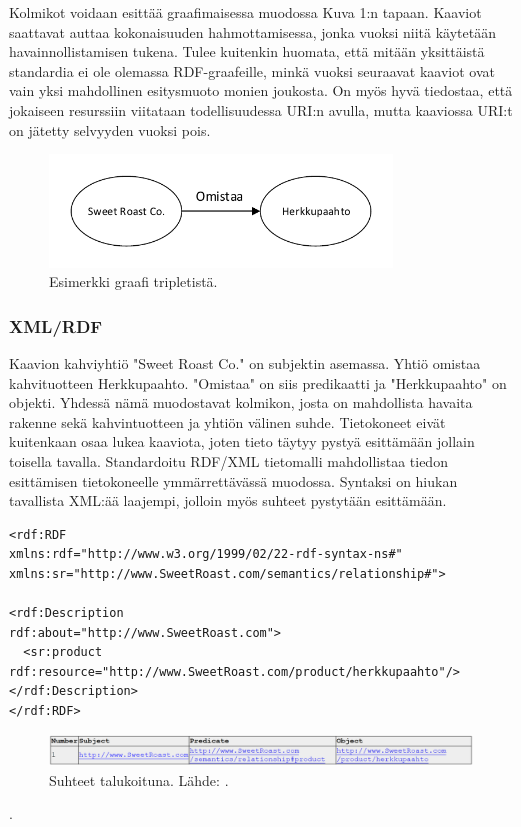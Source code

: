 \documentclass[finnish, 12pt, a4paper, elec, utf8, pdfa, online]{aaltothesis}
\begin{document}
Kolmikot voidaan esittää graafimaisessa muodossa Kuva 1:n tapaan. Kaaviot saattavat auttaa kokonaisuuden hahmottamisessa, jonka vuoksi niitä käytetään havainnollistamisen tukena. Tulee kuitenkin huomata, että mitään yksittäistä standardia ei ole olemassa RDF-graafeille, minkä vuoksi seuraavat kaaviot ovat vain yksi mahdollinen esitysmuoto monien joukosta. On myös hyvä tiedostaa, että jokaiseen resurssiin viitataan todellisuudessa URI:n avulla, mutta kaaviossa URI:t on jätetty selvyyden vuoksi pois.

\begin{figure}[htb]
\centering
\includegraphics[height=3cm]{images/RDF-triplet1.pdf}
\caption{Esimerkki graafi tripletistä. \label{images/RDF-triplet1}}
\end{figure}


\subsubsection{XML/RDF}
Kaavion kahviyhtiö "Sweet Roast Co." on subjektin asemassa. Yhtiö omistaa kahvituotteen Herkkupaahto. "Omistaa" on siis predikaatti ja "Herkkupaahto" on objekti. Yhdessä nämä muodostavat kolmikon, josta on mahdollista havaita rakenne sekä kahvintuotteen ja yhtiön välinen suhde. Tietokoneet eivät kuitenkaan osaa lukea kaaviota, joten tieto täytyy pystyä esittämään jollain toisella tavalla. Standardoitu RDF/XML tietomalli mahdollistaa tiedon esittämisen tietokoneelle ymmärrettävässä muodossa. Syntaksi on hiukan tavallista XML:ää laajempi, jolloin myös suhteet pystytään esittämään.

\vskip 0.75cm
\begin{lstlisting}
<rdf:RDF
xmlns:rdf="http://www.w3.org/1999/02/22-rdf-syntax-ns#"
xmlns:sr="http://www.SweetRoast.com/semantics/relationship#">

<rdf:Description
rdf:about="http://www.SweetRoast.com">
  <sr:product rdf:resource="http://www.SweetRoast.com/product/herkkupaahto"/>
</rdf:Description>
</rdf:RDF>
\end{lstlisting}
\vskip 0.75cm


\begin{figure}[htb]
\centering
\includegraphics[width=15cm]{images/RDF-valid.PNG}
\caption{Suhteet talukoituna. Lähde: \cite{W3C_RDF_validator}. \label{images/RDF-triplet1}}
\end{figure}
\cite{W3C_RDF_validator}.
\end{document}
